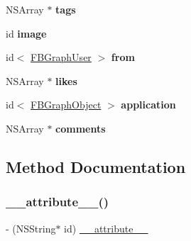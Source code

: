 \begin{DoxyCompactItemize}
N\+S\+Array $\ast$ {\bfseries tags}
\item 
\mbox{\label{protocolFBOpenGraphAction-p_a0480beb216807f886010b725471cf7ad}} 
id {\bfseries image}
\item 
\mbox{\label{protocolFBOpenGraphAction-p_af5c9b9bddfc35852cba41b6e70168e9d}} 
id$<$ \hyperlink{protocolFBGraphUser-p}{F\+B\+Graph\+User} $>$ {\bfseries from}
\item 
\mbox{\label{protocolFBOpenGraphAction-p_a60ceceb680b445f937b0b28948e71531}} 
N\+S\+Array $\ast$ {\bfseries likes}
\item 
\mbox{\label{protocolFBOpenGraphAction-p_a022c1fbdcb7adf839178750d1887f54c}} 
id$<$ \hyperlink{interfaceFBGraphObject}{F\+B\+Graph\+Object} $>$ {\bfseries application}
\item 
\mbox{\label{protocolFBOpenGraphAction-p_a71850eb4a4496760e3705de7db3152ff}} 
N\+S\+Array $\ast$ {\bfseries comments}
\end{DoxyCompactItemize}


\subsection{Method Documentation}
\mbox{\label{protocolFBOpenGraphAction-p_a19948d4253cde780af8d45d030803063}} 
\subsubsection{\texorpdfstring{\+\_\+\+\_\+attribute\+\_\+\+\_\+()}{\_\_attribute\_\_()}\hspace{0.1cm}{\footnotesize\ttfamily [1/5]}}
{\footnotesize\ttfamily -\/ (N\+S\+String$\ast$ id) \hyperlink{struct____attribute____}{\+\_\+\+\_\+attribute\+\_\+\+\_\+} \begin{DoxyParamCaption}\item[{((deprecated(\char`\"{}use object\+ID instead\char`\"{})))}]{ }\end{DoxyParamCaption}}

